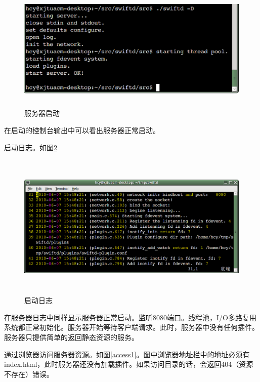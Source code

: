 \documentclass[12pt, twoside, a4paper, xetex]{report}
\begin{document}
	\begin{figure}[t]
	\centering
	\setlength{\abovecaptionskip}{0pt}
	\setlength{\belowcaptionskip}{10pt}
	\caption{服务器启动}
	\label{startup}
	\includegraphics[height=6cm, width=15cm]{pics/startup.eps}
	\end{figure}
	
	在启动的控制台输出中可以看出服务器正常启动。
	
	启动日志。如图\ref{startuplog}
	
	\begin{figure}[t]
	\centering
	\setlength{\abovecaptionskip}{0pt}
	\setlength{\belowcaptionskip}{10pt}
	\caption{启动日志}
	\label{startuplog}
	\includegraphics[height=7cm, width=16cm]{pics/startuplog.eps}
	\end{figure}
	
	在服务器日志中同样显示服务器正常启动。监听8080端口。线程池，I/O多路复用系统都正常初始化。服务器开始等待客户端请求。此时，服务器中没有任何插件。服务器只提供简单的返回静态资源的服务。
	
	通过浏览器访问服务器资源。如图\ref{access1}。图中浏览器地址栏中的地址必须有index.html，此时服务器还没有加载插件。如果访问目录的话，会返回404（资源不存在）错误。
	
\end{document}
